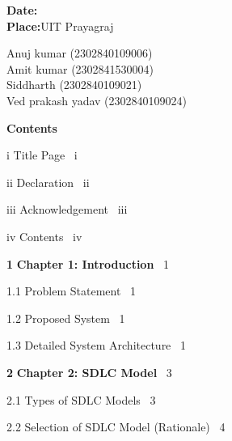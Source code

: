 \documentclass[12pt,a4paper]{report}
\begin{document}
\vspace{1.0cm}

\noindent\textbf{Date:}\\
\noindent\textbf{Place:}\hspace{1cm}UIT Prayagraj

\vspace{1.0cm}
\begin{flushright}

Anuj kumar (2302840109006)\\
Amit kumar (2302841530004)\\
Siddharth (2302840109021)\\
Ved prakash yadav (2302840109024)
\end{flushright}

\clearpage

\clearpage
\thispagestyle{plain}

\begin{center}
{\LARGE\bfseries Contents}\\[-0.1cm]
\end{center}

\vspace{0.2cm}
\setlength{\parindent}{0pt}
\setlength{\parskip}{0.25em}

\noindent i \quad Title Page \dotfill\ i

\noindent ii \quad Declaration \dotfill\ ii

\noindent iii \quad Acknowledgement \dotfill\ iii

\noindent iv \quad Contents \dotfill\ iv

\bigskip

\noindent \textbf{1} \quad \textbf{Chapter 1: Introduction} \dotfill\ 1

\hspace{1.2cm}1.1 \quad Problem Statement \dotfill\ 1

\hspace{1.2cm}1.2 \quad Proposed System \dotfill\ 1

\hspace{1.2cm}1.3 \quad Detailed System Architecture \dotfill\ 1

\bigskip

\noindent \textbf{2} \quad \textbf{Chapter 2: SDLC Model} \dotfill\ 3

\hspace{1.2cm}2.1 \quad Types of SDLC Models \dotfill\ 3

\hspace{1.2cm}2.2 \quad Selection of SDLC Model (Rationale) \dotfill\ 4
\end{document}

